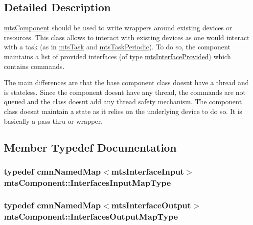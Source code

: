 \subsection{Detailed Description}
\hyperlink{classmts_component}{mts\+Component} should be used to write wrappers around existing devices or resources. This class allows to interact with existing devices as one would interact with a task (as in \hyperlink{classmts_task}{mts\+Task} and \hyperlink{classmts_task_periodic}{mts\+Task\+Periodic}). To do so, the component maintains a list of provided interfaces (of type \hyperlink{classmts_interface_provided}{mts\+Interface\+Provided}) which contains commands.

The main differences are that the base component class doesn\textquotesingle{}t have a thread and is stateless. Since the component doesn\textquotesingle{}t have any thread, the commands are not queued and the class doesn\textquotesingle{}t add any thread safety mechanism. The component class doesn\textquotesingle{}t maintain a state as it relies on the underlying device to do so. It is basically a pass-\/thru or wrapper. 

\subsection{Member Typedef Documentation}
\hypertarget{classmts_component_adfb95e70effe37bd6e8a66388cc9c9ed}{}
\subsubsection[{Interfaces\+Input\+Map\+Type}]{\setlength{\rightskip}{0pt plus 5cm}typedef {\bf cmn\+Named\+Map}$<${\bf mts\+Interface\+Input}$>$ {\bf mts\+Component\+::\+Interfaces\+Input\+Map\+Type}\hspace{0.3cm}{\ttfamily [protected]}}\label{classmts_component_adfb95e70effe37bd6e8a66388cc9c9ed}
\hypertarget{classmts_component_afa3bfa3828ea8532dbbca641006e9589}{}
\subsubsection[{Interfaces\+Output\+Map\+Type}]{\setlength{\rightskip}{0pt plus 5cm}typedef {\bf cmn\+Named\+Map}$<${\bf mts\+Interface\+Output}$>$ {\bf mts\+Component\+::\+Interfaces\+Output\+Map\+Type}\hspace{0.3cm}{\ttfamily [protected]}}\label{classmts_component_afa3bfa3828ea8532dbbca641006e9589}
\hypertarget{classmts_component_a1d4117bf122737abe5f943a7ce057ff6}{}
